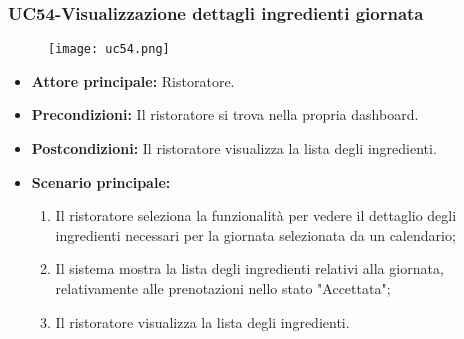 \subsubsection{UC54-Visualizzazione dettagli ingredienti giornata}
\begin{figure}[h] \texttt{[image: uc54.png]} \end{figure}
\begin{itemize}
\item \textbf{Attore principale:} Ristoratore.
\item \textbf{Precondizioni:} Il ristoratore si trova nella propria dashboard.
\item \textbf{Postcondizioni:} Il ristoratore visualizza la lista degli ingredienti.
\item \textbf{Scenario principale:}
\begin{enumerate}
    \item Il ristoratore seleziona la funzionalità per vedere il dettaglio degli ingredienti necessari per la giornata selezionata da un calendario;
    \item Il sistema mostra la lista degli ingredienti relativi alla giornata, relativamente alle prenotazioni nello stato "Accettata";
    \item Il ristoratore visualizza la lista degli ingredienti.
\end{enumerate}
\end{itemize}

